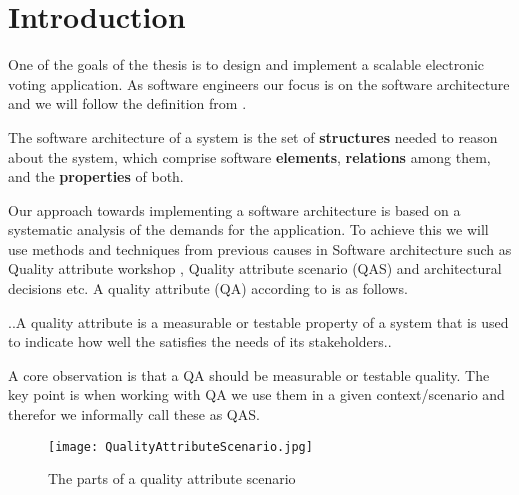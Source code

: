 \section{Introduction}
One of the goals of the thesis is to design and implement a scalable electronic voting application. As software engineers our focus is on the software architecture and we will follow the definition from \cite{Bass}. 


\begin{defi}
The software architecture of a system is the set of \textbf{structures} needed to reason about the system, which comprise software \textbf{elements}, \textbf{relations} among them, and the \textbf{properties} of both. 
\end{defi}

\noindent
Our approach towards implementing a software architecture is based on a systematic analysis of the demands for the application. To achieve this we will use methods and techniques from previous causes in Software architecture such as  Quality attribute workshop \cite{BarbacciQualityAttribute2003}, Quality attribute scenario (QAS) and architectural decisions etc. A quality attribute (QA) according to \cite{Bass} is as follows.


\begin{defi}
..A quality attribute is a measurable or testable property of a system that is used to indicate how well the satisfies the needs of its stakeholders..  
\end{defi}

\noindent
A core observation is that a QA should be measurable or testable quality. The key point is when working with QA we use them in a given context/scenario and therefor we informally call these as QAS.\\


\begin{figure}[H]
\centering
\texttt{[image: QualityAttributeScenario.jpg]}

\caption{The parts of a quality attribute scenario}
\label{fig:Quality_Attribute_Scenario}
\end{figure}






